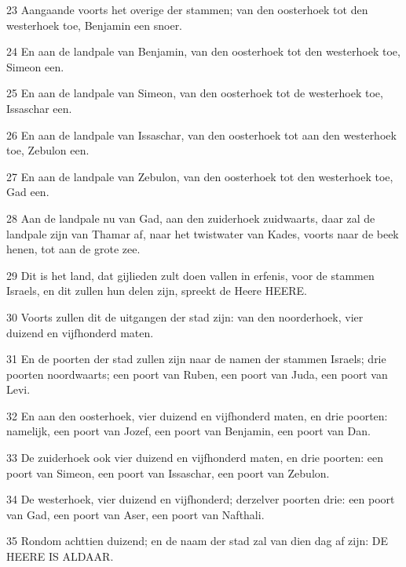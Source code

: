 \par 23 Aangaande voorts het overige der stammen; van den oosterhoek tot den westerhoek toe, Benjamin een snoer.
\par 24 En aan de landpale van Benjamin, van den oosterhoek tot den westerhoek toe, Simeon een.
\par 25 En aan de landpale van Simeon, van den oosterhoek tot de westerhoek toe, Issaschar een.
\par 26 En aan de landpale van Issaschar, van den oosterhoek tot aan den westerhoek toe, Zebulon een.
\par 27 En aan de landpale van Zebulon, van den oosterhoek tot den westerhoek toe, Gad een.
\par 28 Aan de landpale nu van Gad, aan den zuiderhoek zuidwaarts, daar zal de landpale zijn van Thamar af, naar het twistwater van Kades, voorts naar de beek henen, tot aan de grote zee.
\par 29 Dit is het land, dat gijlieden zult doen vallen in erfenis, voor de stammen Israels, en dit zullen hun delen zijn, spreekt de Heere HEERE.
\par 30 Voorts zullen dit de uitgangen der stad zijn: van den noorderhoek, vier duizend en vijfhonderd maten.
\par 31 En de poorten der stad zullen zijn naar de namen der stammen Israels; drie poorten noordwaarts; een poort van Ruben, een poort van Juda, een poort van Levi.
\par 32 En aan den oosterhoek, vier duizend en vijfhonderd maten, en drie poorten: namelijk, een poort van Jozef, een poort van Benjamin, een poort van Dan.
\par 33 De zuiderhoek ook vier duizend en vijfhonderd maten, en drie poorten: een poort van Simeon, een poort van Issaschar, een poort van Zebulon.
\par 34 De westerhoek, vier duizend en vijfhonderd; derzelver poorten drie: een poort van Gad, een poort van Aser, een poort van Nafthali.
\par 35 Rondom achttien duizend; en de naam der stad zal van dien dag af zijn: DE HEERE IS ALDAAR.



